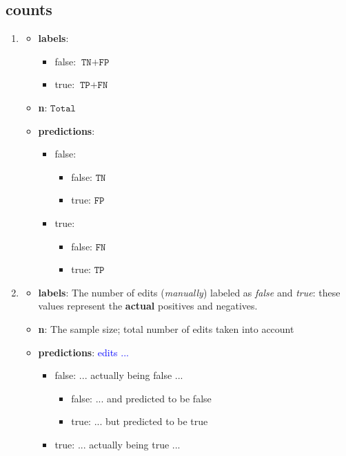 \documentclass[12pt,a4paper]{article}
\begin{document}
\subsection{counts}
\begin{enumerate}
\item \begin{itemize}
\item \textbf{labels}:
\begin{itemize}
\item false:  $\texttt{TN}+\texttt{FP}$
\item true: $\texttt{TP}+\texttt{FN}$
\end{itemize}
\item \textbf{n}: $\texttt{Total}$
\item \textbf{predictions}:
\begin{itemize}
\item false:
\begin{itemize}
\item false: $\texttt{TN}$
\item true: $\texttt{FP}$
\end{itemize}
\item true:
\begin{itemize}
\item false: $\texttt{FN}$
\item true: $\texttt{TP}$
\end{itemize}
\end{itemize}
\end{itemize}
\item \begin{itemize}
\item \textbf{labels}: The number of edits (\textit{manually}) labeled as \textit{false} and \textit{true}: these values represent the \textbf{actual} positives and negatives.
\item \textbf{n}: The sample size; total number of edits taken into account
\item \textbf{predictions}: \textcolor{blue}{edits ...}
\begin{itemize}
\item false: \textcolor{nRed}{... actually being false ...}
\begin{itemize}
\item false: \textcolor{nRed}{... and predicted to be false}
\item true: \textcolor{nRed}{... but predicted to be true}
\end{itemize}
\item true: \textcolor{pGreen}{... actually being true ...}

\end{itemize}
\end{itemize}
\end{enumerate}
\end{document}

